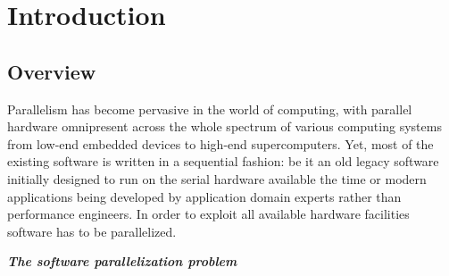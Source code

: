 \chapter{Introduction}
\label{introduction}
\section{Overview}
\label{introduction_overview}
\quad Parallelism has become pervasive in the world of computing, with parallel hardware omnipresent across the whole spectrum of various computing systems from low-end embedded devices to high-end supercomputers. Yet, most of the existing software is written in a sequential fashion: be it an old legacy software initially designed to run on the serial hardware available the time or modern applications being developed by application domain experts rather than performance engineers. In order to exploit all available hardware facilities software has to be parallelized.
\begin{center}
\textbf{\large \textit{The software parallelization problem}}
\end{center}
